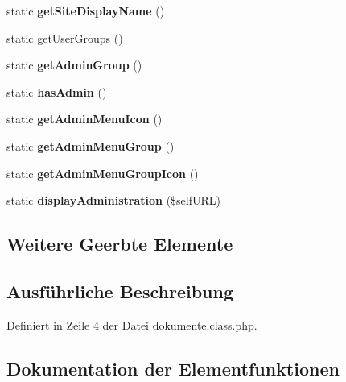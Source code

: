\begin{DoxyCompactItemize}
\item 
\mbox{\label{classdokumente_a027f2367762ea75fab26b4765611efe1}} 
static {\bfseries get\+Site\+Display\+Name} ()
\item 
static \mbox{\hyperlink{classdokumente_a54e5fe41237e984537004709363d1e53}{get\+User\+Groups}} ()
\item 
\mbox{\label{classdokumente_a5f32d0a55dea942acedd77b93ec17572}} 
static {\bfseries get\+Admin\+Group} ()
\item 
\mbox{\label{classdokumente_a87c820043f95d979dadb12df37c6c44b}} 
static {\bfseries has\+Admin} ()
\item 
\mbox{\label{classdokumente_a4a633fa1d351f9b121422fe59775895a}} 
static {\bfseries get\+Admin\+Menu\+Icon} ()
\item 
\mbox{\label{classdokumente_a310bf52aab4832fa76440e20632ab32b}} 
static {\bfseries get\+Admin\+Menu\+Group} ()
\item 
\mbox{\label{classdokumente_a0e3005f5915d6123673b2793d0d58fcb}} 
static {\bfseries get\+Admin\+Menu\+Group\+Icon} ()
\item 
\mbox{\label{classdokumente_afa14a60627d087914d7b97241641ebd4}} 
static {\bfseries display\+Administration} (\$self\+U\+RL)
\end{DoxyCompactItemize}
\subsection*{Weitere Geerbte Elemente}


\subsection{Ausführliche Beschreibung}


Definiert in Zeile 4 der Datei dokumente.\+class.\+php.



\subsection{Dokumentation der Elementfunktionen}
\mbox{\label{classdokumente_a541fbecd2c10b47527f7c5f5e5b61a33}} 
